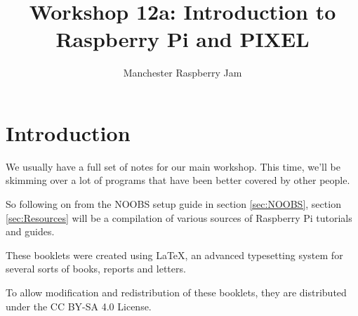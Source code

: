 \documentclass[a4paper, twocolumn, twoside, 11pt]{article}
\begin{document}
	\author{Manchester Raspberry Jam}
	\title{Workshop 12a: Introduction to Raspberry Pi and PIXEL}
	\date{}
	\maketitle
	
	
	\setcounter{tocdepth}{1}
	\tableofcontents
	
	\setcounter{section}{-1}
	\section{Introduction}
		We usually have a full set of notes for our main workshop. This time, we'll be skimming over a lot of programs that have been better covered by other people.
		
		So following on from the NOOBS setup guide in section \ref{sec:NOOBS}, section \ref{sec:Resources} will be a compilation of various sources of Raspberry Pi tutorials and guides.
		
		These booklets were created using {\selectfont \LaTeX}, an advanced typesetting system for several sorts of books, reports and letters.
		
		To allow modification and redistribution of these booklets, they are distributed under the CC BY-SA 4.0 License.
	
	
		
\end{document}
